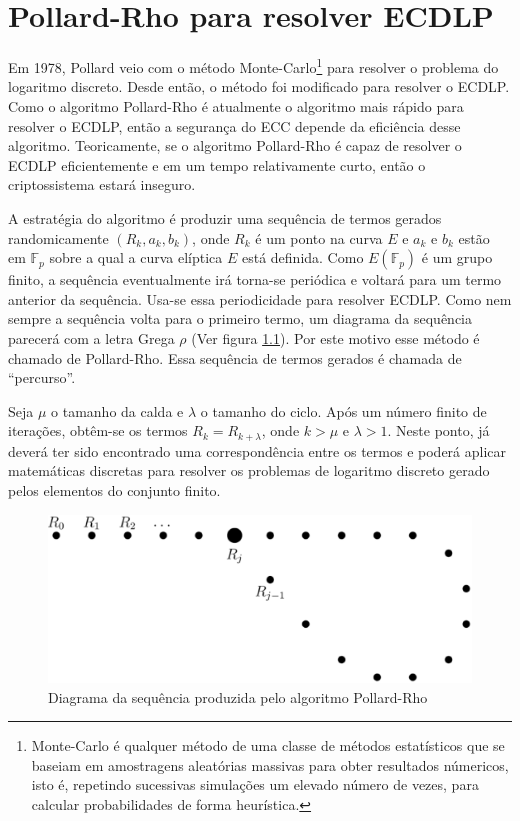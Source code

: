 \chapter{Pollard-Rho para resolver ECDLP}
Em 1978, Pollard veio com o método Monte-Carlo\footnote{Monte-Carlo é qualquer método de uma classe de métodos estatísticos que se baseiam em amostragens aleatórias massivas para obter resultados númericos, isto é, repetindo sucessivas simulações um elevado número de vezes, para calcular probabilidades de forma heurística.} para resolver o problema do logaritmo discreto. Desde então, o método foi modificado para resolver o ECDLP. Como o algoritmo Pollard-Rho é atualmente o algoritmo mais rápido para resolver o ECDLP, então a segurança do ECC depende da eficiência desse algoritmo. Teoricamente, se o algoritmo Pollard-Rho é capaz de resolver o ECDLP eficientemente e em um tempo relativamente curto, então o criptossistema estará inseguro. \cite{Mandy:2007}

A estratégia do algoritmo é produzir uma sequência de termos gerados randomicamente $(R_k, a_k, b_k)$, onde \(R_k\) é um ponto na curva \(E\) e \(a_k\)  e \(b_k\) estão em $\mathbb{F}_p$ sobre a qual a curva elíptica \(E\) está definida. Como $E(\mathbb{F}_p)$ é um grupo finito, a sequência eventualmente irá torna-se periódica e voltará para um termo anterior da sequência. Usa-se essa periodicidade para resolver ECDLP. Como nem sempre a sequência volta para o primeiro termo, um diagrama da sequência parecerá com a letra Grega \(\rho\) (Ver figura \ref{fig:rho}). Por este motivo esse método é chamado de Pollard-Rho. Essa sequência de termos gerados é chamada de ``percurso''.

Seja \(\mu\) o tamanho da calda e \(\lambda\) o tamanho do ciclo. Após um número finito de iterações, obtêm-se os termos $R_k = R_{k+\lambda}$, onde $k > \mu$ e $\lambda > 1$. Neste ponto, já deverá ter sido encontrado uma correspondência entre os termos e poderá aplicar matemáticas discretas para resolver os problemas de logaritmo discreto gerado pelos elementos do conjunto finito.

\begin{figure}[h]
\centering
\includegraphics[scale=0.4, bb=0 0 888 376]{figuras/rho.eps}
\caption{Diagrama da sequência produzida pelo algoritmo Pollard-Rho}
\label{fig:rho}
\end{figure}

